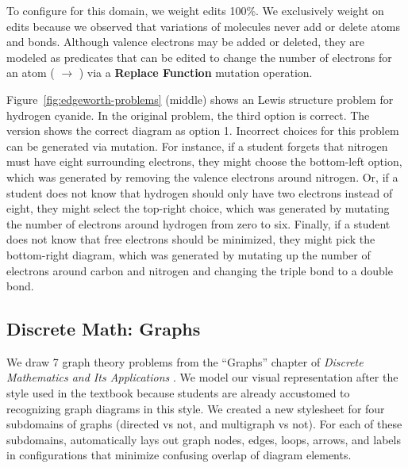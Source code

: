 To configure \Edgeworth for this domain, we weight edits 100\%. We exclusively weight on edits because we observed that variations of molecules never add or delete atoms and bonds. Although valence electrons may be added or deleted, they are modeled as predicates that can be edited to change the number of electrons for an atom (\eg {} $\rightarrow$ ) via a \textbf{Replace Function} mutation operation. 

Figure~\ref{fig:edgeworth-problems} (middle) shows an \Edgeworth Lewis structure problem for hydrogen cyanide. In the original problem, the third option is correct. The \Edgeworth version shows the correct diagram as option 1. Incorrect choices for this problem can be generated via mutation. For instance, if a student forgets that nitrogen must have eight surrounding electrons, they might choose the bottom-left option, which was generated by removing the valence electrons around nitrogen. Or, if a student does not know that hydrogen should only have two electrons instead of eight, they might select the top-right choice, which was generated by mutating the number of electrons around hydrogen from zero to six. Finally, if a student does not know that free electrons should be minimized, they might pick the bottom-right diagram, which was generated by mutating up the number of electrons around carbon and nitrogen and changing the triple bond to a double bond.

\subsection{Discrete Math: Graphs}
\label{sec:graphs}


We draw 7 graph theory problems from the ``Graphs'' chapter of \textit{Discrete Mathematics and Its Applications} \cite[Chapter~10]{rosen1999discrete}.  We model our visual representation after the style used in the textbook because students are already accustomed to recognizing graph diagrams in this style. We created a new \Penrose stylesheet for four subdomains of graphs (directed vs not, and multigraph vs not). For each of these subdomains, \Edgeworth automatically lays out graph nodes, edges, loops, arrows, and labels in configurations that minimize confusing overlap of diagram elements. 


